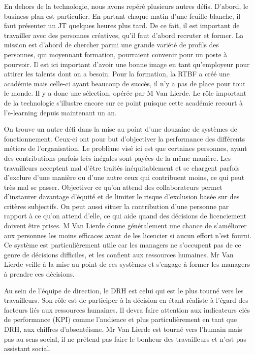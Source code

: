 \documentclass[a4paper, 12pt]{article}
\begin{document}
En dehors de la technologie, nous avons repéré plusieurs autres défis. D'abord, le business plan est particulier. En partant chaque matin d'une feuille blanche, il faut présenter un JT quelques heures plus tard. De ce fait, il est important de travailler avec des personnes créatives, qu'il faut d'abord recruter et former. La mission est d'abord de chercher parmi une grande variété de profils des personnes, qui moyennant formation, pourraient convenir pour un poste à pourvoir. Il est ici important d'avoir une bonne image en tant qu'employeur pour attirer les talents dont on a besoin. Pour la formation, la RTBF a créé une académie mais celle-ci ayant beaucoup de succès, il n'y a pas de place pour tout le monde. Il y a donc une sélection, opérée par M Van Lierde. Le rôle important de la technologie s'illustre encore sur ce point puisque cette académie recourt à l'e-learning depuis maintenant un an.

On trouve un autre défi dans la mise au point d'une douzaine de systèmes de fonctionnement. Ceux-ci ont pour but d'objectiver la performance des différents métiers de l'organisation. Le problème visé ici est que certaines personnes, ayant des contributions parfois très inégales sont payées de la même manière. Les travailleurs acceptent mal d'être traités inéquitablement et se chargent parfois d'exclure d'une manière ou d'une autre ceux qui contribuent moins, ce qui peut très mal se passer. Objectiver ce qu'on attend des collaborateurs permet d'instaurer davantage d'équité et de limiter le risque d'exclusion basée sur des critères subjectifs. On peut aussi situer la contribution d'une personne par rapport à ce qu'on attend d'elle, ce qui aide quand des décisions de licenciement doivent être prises. M Van Lierde donne généralement une chance de s'améliorer aux personnes les moins efficaces avant de les licencier si aucun effort n'est fourni. Ce système est particulièrement utile car les managers ne s'occupent pas de ce genre de décisions difficiles, et les confient aux ressources humaines. Mr Van Lierde veille à la mise au point de ces systèmes et s'engage à former les managers à prendre ces décisions.

Au sein de l'équipe de direction, le DRH est celui qui est le plus tourné vers les travailleurs. Son rôle est de participer à la décision en étant réaliste à l'égard des facteurs liés aux ressources humaines. Il devra faire attention aux indicateurs clés de performance (KPI) comme l'audience et plus particulièrement en tant que DRH, aux chiffres d'absentéisme. Mr Van Lierde est tourné vers l'humain mais pas au sens social, il ne prétend pas faire le bonheur des travailleurs et n'est pas assistant social.
\end{document}
